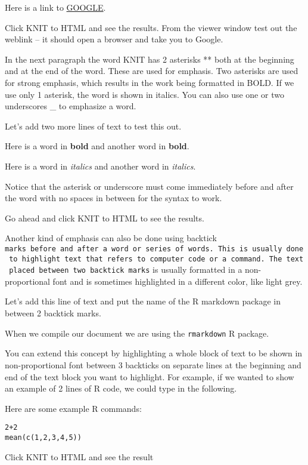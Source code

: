 \documentclass[
]{book}
\begin{document}
Here is a link to \href{http://google.com}{GOOGLE}.

Click KNIT to HTML and see the results. From the viewer window test out the weblink -- it should open a browser and take you to Google.

In the next paragraph the word KNIT has 2 asterisks ** both at the beginning and at the end of the word. These are used for emphasis. Two asterisks are used for strong emphasis, which results in the work being formatted in BOLD. If we use only 1 asterisk, the word is shown in italics. You can also use one or two underscores \_ to emphasize a word.

Let's add two more lines of text to test this out.

Here is a word in \textbf{bold} and another word in \textbf{bold}.

Here is a word in \emph{italics} and another word in \emph{italics}.

Notice that the asterisk or underscore must come immediately before and after the word with no spaces in between for the syntax to work.

Go ahead and click KNIT to HTML to see the results.

Another kind of emphasis can also be done using backtick \texttt{marks\ before\ and\ after\ a\ word\ or\ series\ of\ words.\ This\ is\ usually\ done\ to\ highlight\ text\ that\ refers\ to\ computer\ code\ or\ a\ command.\ The\ text\ placed\ between\ two\ backtick\ marks} is usually formatted in a non-proportional font and is sometimes highlighted in a different color, like light grey.

Let's add this line of text and put the name of the R markdown package in between 2 backtick marks.

When we compile our document we are using the \texttt{rmarkdown} R package.

You can extend this concept by highlighting a whole block of text to be shown in non-proportional font between 3 backticks on separate lines at the beginning and end of the text block you want to highlight. For example, if we wanted to show an example of 2 lines of R code, we could type in the following.

Here are some example R commands:

\begin{verbatim}
2+2
mean(c(1,2,3,4,5))
\end{verbatim}

Click KNIT to HTML and see the result
\end{document}
